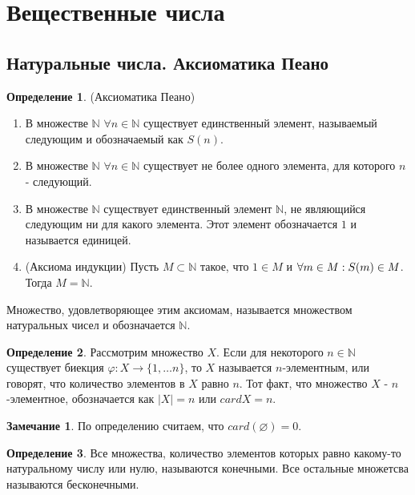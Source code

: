 \documentclass[a4paper, 12pt]{article}
\newcommand{\N}{\mathbb{N}}
\renewcommand{\phi}{\varphi}
\renewcommand{\emptyset}{\varnothing}
\theoremstyle{definition}
\newtheorem*{definition}{Определение}
\newtheorem*{comm}{Замечание}
\begin{document}
    \section{Вещественные числа}
    \subsection{Натуральные числа. Аксиоматика Пеано}
        \begin{definition} (Аксиоматика Пеано)
            \begin{enumerate}
                \item В множестве $\N$ $\forall n\in \N$ существует единственный элемент, называемый следующим и обозначаемый как $S(n)$.
                \item В множестве $\N$ $\forall n\in \N$ существует не более одного элемента, для которого $n$ - следующий.
                \item В множестве $\N$ существует единственный элемент $\N$, не являющийся следующим ни для какого элемента. Этот элемент обозначается $1$ и называется единицей.
                \item (Аксиома индукции) Пусть $M\subset \N$ такое, что $1\in M$ и $\forall m\in M:\\ S(m)\in M$. Тогда $M=\N$.
            \end{enumerate}
        Множество, удовлетворяющее этим аксиомам, называется множеством натуральных чисел и обозначается $\N$.
        \end{definition}
        \begin{definition}
            Рассмотрим  множество $X$. Если для некоторого $n\in \N$ существует биекция $\phi: X\to \{1, \dots n\}$, то $X$ называется $n$-элементным, или говорят, что количество элементов в $X$ равно $n$. Тот факт, что множество $X$ - $n$-элементное, обозначается как $|X|=n$ или $cardX=n$.
        \end{definition} 
        \begin{comm}
            По определению считаем, что $card(\emptyset) =0$.
        \end{comm}
        \begin{definition}
            Все множества, количество элементов которых равно какому-то натуральному числу или нулю, называются конечными. Все остальные множетсва называются бесконечными.
        \end{definition}
\end{document}
